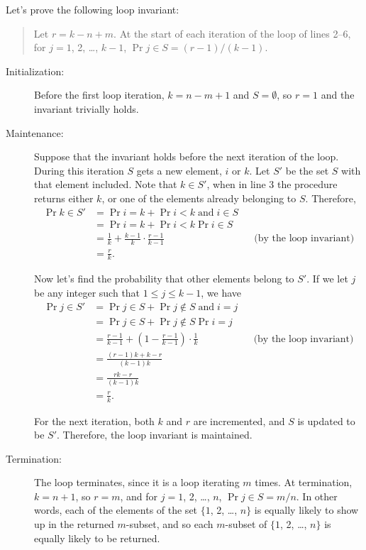Let's prove the following loop invariant:
\begin{quote}
    Let $r=k-n+m$.
    At the start of each iteration of the  loop of lines 2--6, for $j=1$, 2, \dots, $k-1$, $\Pr{j\in S}=(r-1)/(k-1)$.
\end{quote}

\begin{description}
    \item[Initialization:] Before the first loop iteration, $k=n-m+1$ and $S=\emptyset$, so $r=1$ and the invariant trivially holds.
    \item[Maintenance:] Suppose that the invariant holds before the next iteration of the loop.
    During this iteration $S$ gets a new element, $i$ or $k$.
    Let $S'$ be the set $S$ with that element included.
    Note that $k\in S'$, when in line 3 the  procedure returns either $k$, or one of the elements already belonging to $S$.
    Therefore,
    \begin{align*}
        \Pr{k\in S'} &= \Pr{i=k}+\Pr{i<k\;\text{and}\;i\in S} \\
        &= \Pr{i=k}+\Pr{i<k}\Pr{i\in S} \\
        &= \frac{1}{k}+\frac{k-1}{k}\cdot\frac{r-1}{k-1} && \text{(by the loop invariant)} \\[1mm]
        &= \frac{r}{k}.
    \end{align*}

    Now let's find the probability that other elements belong to $S'$.
    If we let $j$ be any integer such that $1\le j\le k-1$, we have
    \begin{align*}
        \Pr{j\in S'} &= \Pr{j\in S}+\Pr{j\notin S\;\text{and}\;i=j} \\
        &= \Pr{j\in S}+\Pr{j\notin S}\Pr{i=j} \\
        &= \frac{r-1}{k-1}+\left(1-\frac{r-1}{k-1}\right)\cdot\frac{1}{k} && \text{(by the loop invariant)} \\
        &= \frac{(r-1)k+k-r}{(k-1)k} \\
        &= \frac{rk-r}{(k-1)k} \\[1mm]
        &= \frac{r}{k}.
    \end{align*}

    For the next iteration, both $k$ and $r$ are incremented, and $S$ is updated to be $S'$.
    Therefore, the loop invariant is maintained.

    \item[Termination:] The loop terminates, since it is a  loop iterating $m$ times.
    At termination, $k=n+1$, so $r=m$, and for $j=1$, 2, \dots, $n$, $\Pr{j\in S}=m/n$.
    In other words, each of the elements of the set $\{1$, 2, \dots, $n\}$ is equally likely to show up in the returned $m$-subset, and so each $m$-subset of $\{1$, 2, \dots, $n\}$ is equally likely to be returned.
\end{description}
